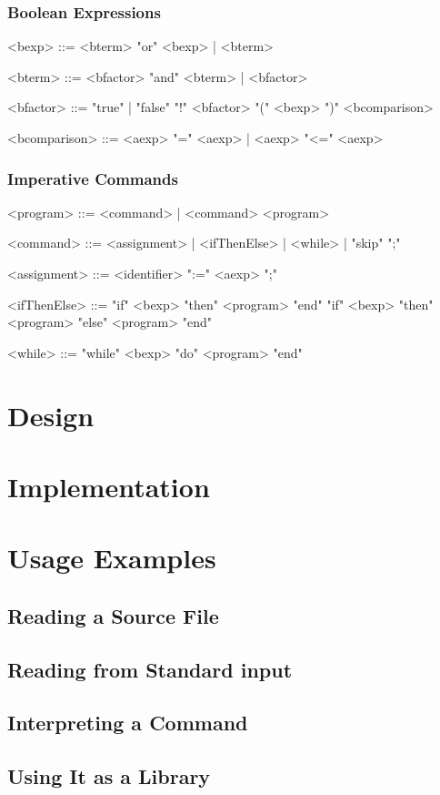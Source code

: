 \documentclass{esposito-documentation}
\begin{document}
\subsection{Boolean Expressions}
\begin{grammar}
	<bexp> ::= <bterm> "or" <bexp> | <bterm>

	<bterm> ::= <bfactor> "and" <bterm> | <bfactor>

	<bfactor> ::= "true" | "false"
	\alt "!" <bfactor>
	\alt "(" <bexp> ")"
	\alt <bcomparison>

	<bcomparison> ::= <aexp> "=" <aexp> | <aexp> "<=" <aexp>
\end{grammar}

\subsection{Imperative Commands}
\begin{grammar}
	<program> ::= <command> | <command> <program>

	<command> ::= <assignment> | <ifThenElse> | <while> | "skip" ";"

	<assignment> ::= <identifier> ":=" <aexp> ";"

	<ifThenElse> ::= "if" <bexp> "then" <program> "end"
	\alt "if" <bexp> "then" <program> "else" <program> "end"

	<while> ::= "while" <bexp> "do" <program> "end"
\end{grammar}

\chapter{Design}

\chapter{Implementation}

\chapter{Usage Examples}

\section{Reading a Source File}

\section{Reading from Standard input}

\section{Interpreting a Command}

\section{Using It as a Library}
\end{document}
